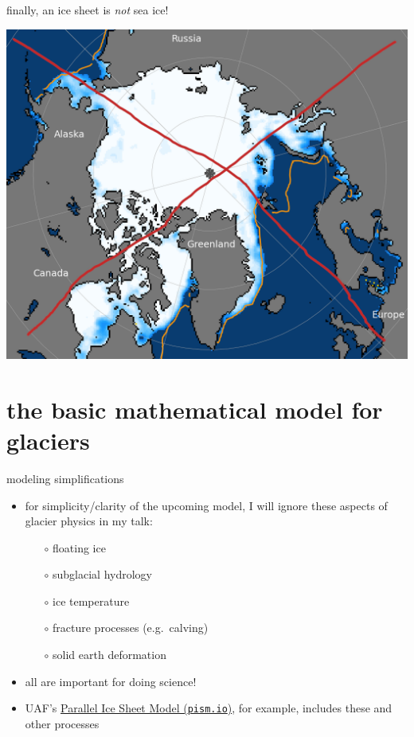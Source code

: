 \documentclass[svgnames,
               hyperref={colorlinks,citecolor=DeepPink4,linkcolor=FireBrick,urlcolor=Maroon},
               usepdftitle=false]  %
               {beamer}
\begin{document}
\begin{frame}{finally, an ice sheet is \emph{not} sea ice!}
\begin{center}
\includegraphics[height=0.8\textheight]{../images/not-sea-ice.png}
\end{center}
\end{frame}



\section{the basic mathematical model for glaciers}


\begin{frame}{modeling simplifications}

\begin{itemize}
\item for simplicity/clarity of the upcoming model, I will \alert{ignore} these aspects of glacier physics in my talk:
    \begin{itemize}
    \item[$\circ$] floating ice
    \item[$\circ$] subglacial hydrology
    \item[$\circ$] ice temperature
    \item[$\circ$] fracture processes (e.g.~calving)
    \item[$\circ$] solid earth deformation
    \end{itemize}

\medskip
\item all are important for doing science!
\item UAF's \href{https://pism.io/}{Parallel Ice Sheet Model (\texttt{pism.io})}, for example, includes these and other processes
\end{itemize}
\end{frame}
\end{document}

